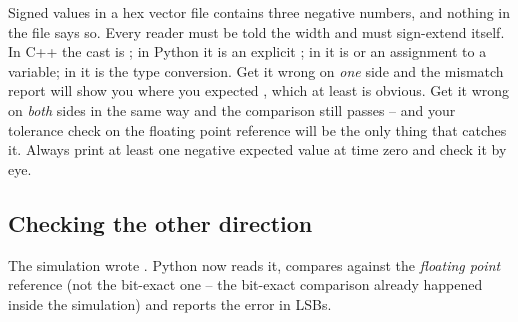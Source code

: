 
\begin{gotcha}{Signed values in a hex vector file}
 contains three negative numbers, and nothing
in the file says so. Every reader must be told the width and must sign-extend
itself. In C++ the cast is ; in Python it is
an explicit ; in \SV{} it is
 or an assignment to a   variable;
in \VHDL{} it is the  type conversion. Get it wrong on
\emph{one} side and the mismatch report will show you  where you
expected , which at least is obvious. Get it wrong on
\emph{both} sides in the same way and the comparison still passes -- and your
tolerance check on the floating point reference will be the only thing that
catches it. Always print at least one negative expected value at time zero
and check it by eye.
\end{gotcha}

\subsection{Checking the other direction}

The simulation wrote . Python now reads it, compares
against the \emph{floating point} reference (not the bit-exact one -- the
bit-exact comparison already happened inside the simulation) and reports the
error in LSBs.


